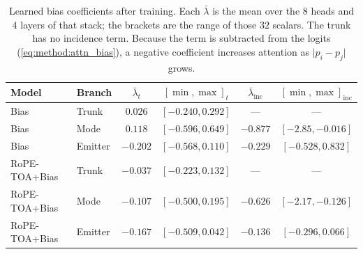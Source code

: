 \begin{table}[tbp]
  \centering
  \small
  \caption{Learned bias coefficients after training. Each $\bar\lambda$ is the mean over the $8$ heads and $4$ layers of that stack; the brackets are the range of those $32$ scalars. The trunk has no incidence term. Because the term is subtracted from the logits (\cref{eq:method:attn_bias}), a negative coefficient increases attention as $\lvert p_i-p_j\rvert$ grows.}
  \label{tab:exp:bias_coef}
  \begin{tabular}{@{}llcccc@{}}
    \toprule
    Model & Branch & $\bar\lambda_t$ & $[\min,\max]_t$ & $\bar\lambda_{\mathrm{inc}}$ & $[\min,\max]_{\mathrm{inc}}$ \\
    \midrule
    Bias & Trunk & $0.026$ & $[-0.240,0.292]$ & {---} & {---} \\
    Bias & Mode & $0.118$ & $[-0.596,0.649]$ & $-0.877$ & $[-2.85,-0.016]$ \\
    Bias & Emitter & $-0.202$ & $[-0.568,0.110]$ & $-0.229$ & $[-0.528,0.832]$ \\
    RoPE-TOA+Bias & Trunk & $-0.037$ & $[-0.223,0.132]$ & {---} & {---} \\
    RoPE-TOA+Bias & Mode & $-0.107$ & $[-0.500,0.195]$ & $-0.626$ & $[-2.17,-0.126]$ \\
    RoPE-TOA+Bias & Emitter & $-0.167$ & $[-0.509,0.042]$ & $-0.136$ & $[-0.296,0.066]$ \\
    \bottomrule
  \end{tabular}
\end{table}
